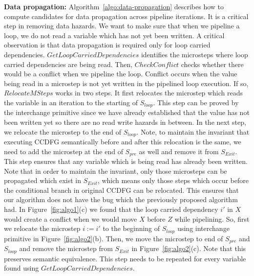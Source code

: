 {\bf Data propagation:} Algorithm~\ref{algo:data-propagation} describes how to compute candidates for data
propagation across pipeline iterations. It is a critical step in removing data hazards. We want to make sure that when we pipeline a loop, we do not read a variable which has not
yet been written. A critical observation is that data propagation is required only for loop carried dependencies.
$GetLoopCarriedDependencies$ identifies the microsteps where loop carried dependencies are being read. Then,
$CheckConflict$ checks whether there would be a conflict when we pipeline the loop.
Conflict occurs when the value being read in a microstep is not yet written in the pipelined loop execution. If so, $RelocateMSteps$ works in two steps. It first relocates the microstep which reads the variable in an iteration to the starting of $S_{loop}$. This step can be proved by the interchange primitive since we have already established that the value has not been written yet so there are no read write hazards in between. In the next step, we relocate the microstep to the end of $S_{loop}$. Note, to maintain the invariant that executing CCDFG semantically before and after this relocation is the same, we need to add the microstep at the end of $S_{pre}$ as well and remove it from $S_{Exit}$. This step ensures that any variable which is being read has already been written. Note that in order to maintain the invariant, only those microsteps can be propagated which exist in $S_{Exit}$, which means only those steps which occur before the conditional branch in original CCDFG can be relocated. This ensures that our algorithm does not have the bug which the previously proposed algorithm had.
In Figure~\ref{fig:algo1}(c) we found that the loop carried dependency $i'$ in $X$ would create a conflict when we would move $X$ before $Z$ while pipelining. So, first we relocate the microstep $i := i'$ to the beginning of $S_{loop}$ using interchange primitive in Figure~\ref{fig:algo2}(b). Then, we move the microstep to end of $S_{pre}$ and $S_{loop}$ and remove the microstep from $S_{Exit}$ in  Figure~\ref{fig:algo2}(c). Note that this preserves semantic equivalence.
This step needs to be repeated for every variable found using $GetLoopCarriedDependencies$.


